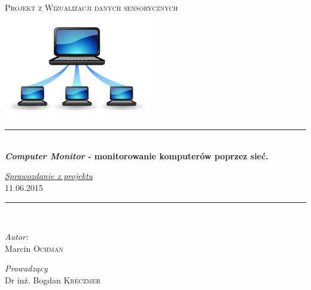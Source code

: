 \begin{titlepage}
\begin{center}

 \newcommand{\HRule}{\rule{\linewidth}{0.5mm}}

\textsc{\Large Projekt z Wizualizacji danych sensorycznych}\\[1cm]

\includegraphics{network_icon}


\HRule \\[0.4cm]
{ \huge \bfseries \textit{Computer Monitor} - monitorowanie komputerów poprzez sieć.\\[0.4cm] }

{\huge \underline{\textit{Sprawozdanie z projektu }}}\\[0.5cm]


\LARGE 11.06.2015
\HRule \\[1.5cm]


\noindent
\begin{minipage}[t]{0.4\textwidth}
\begin{flushleft} \large
\emph{Autor:}\\
Marcin \textsc{Ochman}
\end{flushleft}
\end{minipage}%
\begin{minipage}[t]{0.4\textwidth}
\begin{flushright} \large
\emph{Prowadzący} \\
Dr inż. Bogdan \textsc{Kreczmer}
\end{flushright}
\end{minipage}


\end{center}
\end{titlepage}
